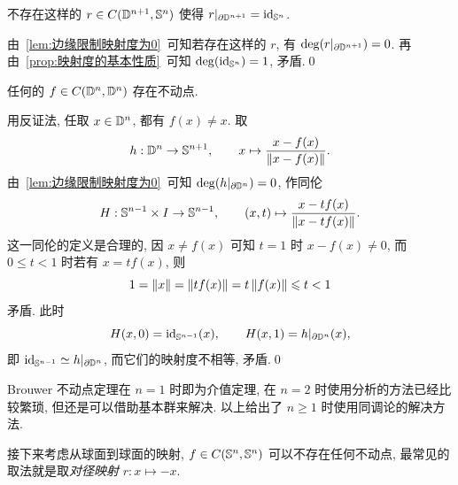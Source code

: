 \begin{Lemma}
	不存在这样的 $ r\in C(\D^{n+1},\S^n) $ 使得 $ r|_{\partial \D^{n+1}}=\id_{\S^n} $.
\end{Lemma}
\begin{Proof}
	由~\ref{lem:边缘限制映射度为0}~可知若存在这样的 $ r $, 有 $ \deg(r|_{\partial\D^{n+1}})=0 $. 再由~\ref{prop:映射度的基本性质}~可知 $ \deg(\id_{\S^n})=1 $, 矛盾.\qed
\end{Proof}

\begin{Theorem}\label{thm:Brouwer 不动点定理}
任何的 $ f\in C(\D^n,\D^n) $ 存在不动点.
\end{Theorem}
\begin{Proof}
	用反证法, 任取 $ x\in\D^n $, 都有 $ f(x)\ne x $. 取
	\[
		h : \D^n\to\S^{n+1},\qquad x\mapsto\frac{x-f(x)}{\norm{x-f(x)}}.
	\]
	由~\ref{lem:边缘限制映射度为0}~可知 $ \deg(h|_{\partial\D^n})=0 $, 作同伦
	\[
		H : \S^{n-1}\times I\to\S^{n-1},\qquad (x,t)\mapsto\frac{x-tf(x)}{\norm{x-tf(x)}}.
	\]
	这一同伦的定义是合理的, 因 $ x\ne f(x) $ 可知 $ t=1 $ 时 $ x-f(x)\ne 0 $, 而 $ 0\leqslant t<1 $ 时若有 $ x=tf(x) $, 则
	\[
		1=\norm{x}=\norm{tf(x)}=t\norm{f(x)}\leqslant t<1
	\]
	矛盾. 此时
	\[
		H(x,0)=\id_{\S^{n-1}}(x),\qquad H(x,1)=h|_{\partial\D^n}(x),
	\]
	即 $ \id_{\S^{n-1}}\simeq h|_{\partial\D^n} $, 而它们的映射度不相等, 矛盾.\qed
\end{Proof}

Brouwer 不动点定理在 $ n=1 $ 时即为介值定理, 在 $ n=2 $ 时使用分析的方法已经比较繁琐, 但还是可以借助基本群来解决. 以上给出了 $ n\geqslant 1 $ 时使用同调论的解决方法.

接下来考虑从球面到球面的映射, $ f\in C(\S^n,\S^n) $ 可以不存在任何不动点, 最常见的取法就是取\emph{对径映射} $ r : x\mapsto -x $.

